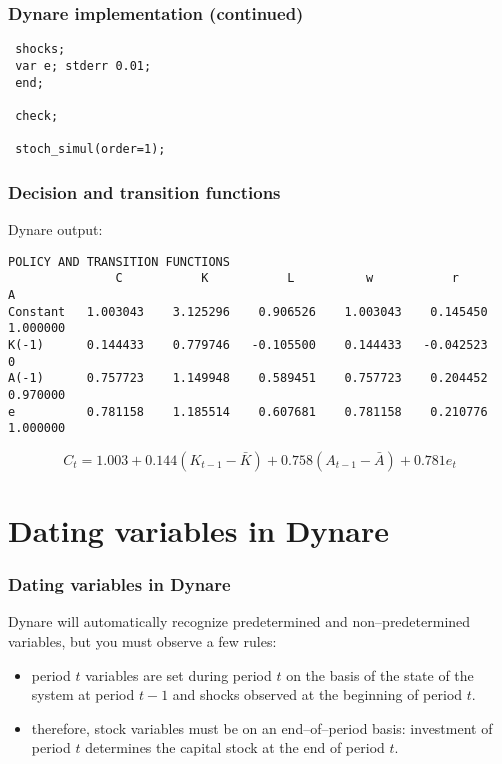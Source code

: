 \documentclass{beamer}
\begin{document}
\begin{frame}[fragile]
\frametitle{Dynare implementation (continued)}
\begin{verbatim}
 shocks;
 var e; stderr 0.01;
 end;

 check;

 stoch_simul(order=1);
\end{verbatim}
\end{frame}

\begin{frame}[fragile]
  \frametitle{Decision and transition functions}
Dynare output:
{\tiny
\begin{verbatim}
POLICY AND TRANSITION FUNCTIONS
               C           K           L          w           r           A
Constant   1.003043    3.125296    0.906526    1.003043    0.145450    1.000000
K(-1)      0.144433    0.779746   -0.105500    0.144433   -0.042523           0
A(-1)      0.757723    1.149948    0.589451    0.757723    0.204452    0.970000
e          0.781158    1.185514    0.607681    0.781158    0.210776    1.000000
\end{verbatim}
}
\[
C_t = 1.003 + 0.144\left(K_{t-1}-\bar K\right)+0.758
\left(A_{t-1}-\bar A\right) + 0.781 e_t
\]
\end{frame}

\section[Dating variables in Dynare]{Dating variables in Dynare}
\begin{frame}
  \frametitle{Dating variables in Dynare}
Dynare will automatically recognize predetermined and non--predetermined variables, but you must observe a few rules:
\begin{itemize}
\item period $t$ variables are set during period $t$ on the basis of the state of the system at period $t-1$ and shocks observed at the beginning of period $t$.
\item therefore, stock variables must be on an end--of--period basis: investment of period $t$ determines the capital stock at the end of period $t$.
\end{itemize}
\end{frame}
\end{document}

